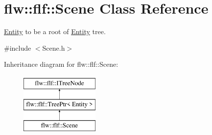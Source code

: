\hypertarget{classflw_1_1flf_1_1Scene}{}\section{flw\+:\+:flf\+:\+:Scene Class Reference}
\label{classflw_1_1flf_1_1Scene}


\hyperlink{classflw_1_1flf_1_1Entity}{Entity} to be a root of \hyperlink{classflw_1_1flf_1_1Entity}{Entity} tree.  




{\ttfamily \#include $<$Scene.\+h$>$}

Inheritance diagram for flw\+:\+:flf\+:\+:Scene\+:\begin{figure}[H]
\begin{center}
\leavevmode
\includegraphics[height=3.000000cm]{classflw_1_1flf_1_1Scene}
\end{center}
\end{figure}
